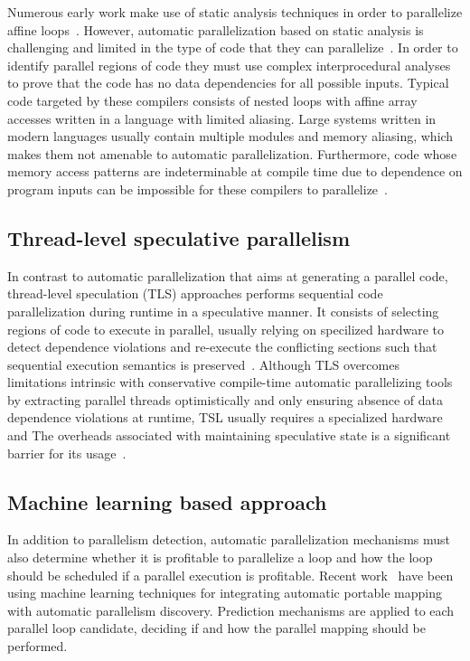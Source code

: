 \documentclass[a4paper,12pt]{article}
\begin{document}
Numerous early work make use of static analysis techniques in order to
parallelize affine
loops~\cite{kuck81,padua93,blume94,lim97,bondhugula08,misailovic13}.  However,
automatic parallelization based on static analysis is challenging and limited
in the type of code that they can
parallelize~\cite{bruening98,kennedy01,chen03}.  In order to identify parallel
regions of code they must use complex interprocedural analyses to prove that
the code has no data dependencies for all possible inputs.  Typical code
targeted by these compilers consists of nested loops with affine array accesses
written in a language with limited aliasing. Large systems written in modern
languages usually contain multiple modules and memory aliasing, which makes
them not amenable to automatic parallelization.  Furthermore, code whose memory
access patterns are indeterminable at compile time due to dependence on program
inputs can be impossible for these compilers to parallelize~\cite{bruening98}.

\subsection{Thread-level speculative parallelism}

In contrast to automatic parallelization that aims at generating a parallel
code, thread-level speculation (TLS) approaches performs sequential code
parallelization during runtime in a speculative manner.  It consists of
selecting regions of code to execute in parallel, usually relying on specilized
hardware to detect dependence violations and re-execute the conflicting
sections such that sequential execution semantics is
preserved~\cite{hammond98,chen03,wu08}.  Although TLS overcomes limitations
intrinsic with conservative compile-time automatic parallelizing tools by
extracting parallel threads optimistically and only ensuring absence of data
dependence violations at runtime, TSL usually requires a specialized hardware
and The overheads associated with maintaining speculative state is a
significant barrier for its usage~\cite{yiapanis13}.

\subsection{Machine learning based approach}

In addition to parallelism detection, automatic parallelization mechanisms must
also determine whether it is profitable to parallelize a loop and how the loop
should be scheduled if a parallel execution is profitable.  Recent
work~\cite{wang09,tournavitis09,wang14a} have been using machine learning
techniques for integrating automatic portable mapping with automatic
parallelism discovery.  Prediction mechanisms are applied to each parallel loop
candidate, deciding if and how the parallel mapping should be performed.
\end{document}
